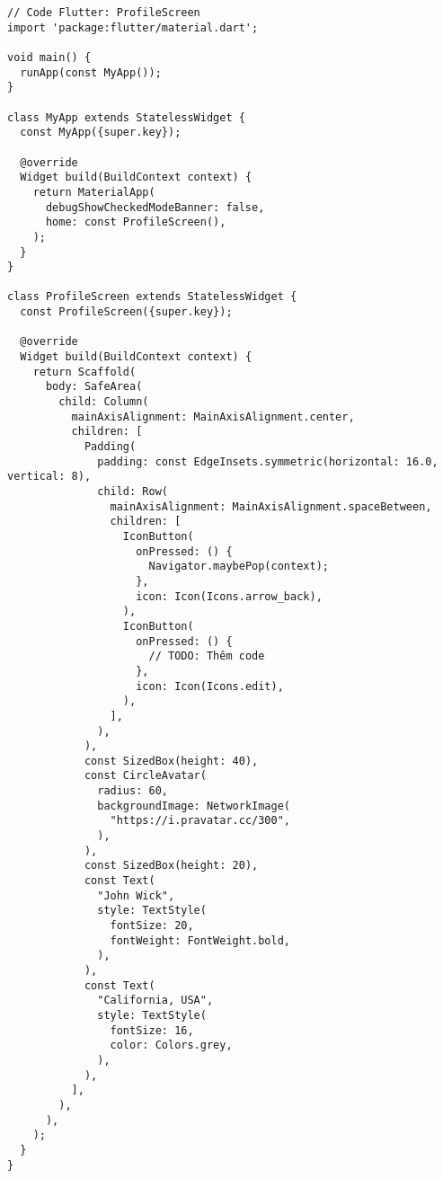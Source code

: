\documentclass[a4paper,12pt]{article} %
\begin{document}
\begin{lstlisting}
// Code Flutter: ProfileScreen
import 'package:flutter/material.dart';

void main() {
  runApp(const MyApp());
}

class MyApp extends StatelessWidget {
  const MyApp({super.key});

  @override
  Widget build(BuildContext context) {
    return MaterialApp(
      debugShowCheckedModeBanner: false,
      home: const ProfileScreen(),
    );
  }
}

class ProfileScreen extends StatelessWidget {
  const ProfileScreen({super.key});

  @override
  Widget build(BuildContext context) {
    return Scaffold(
      body: SafeArea(
        child: Column(
          mainAxisAlignment: MainAxisAlignment.center,
          children: [
            Padding(
              padding: const EdgeInsets.symmetric(horizontal: 16.0, vertical: 8),
              child: Row(
                mainAxisAlignment: MainAxisAlignment.spaceBetween,
                children: [
                  IconButton(
                    onPressed: () {
                      Navigator.maybePop(context);
                    },
                    icon: Icon(Icons.arrow_back),
                  ),
                  IconButton(
                    onPressed: () {
                      // TODO: Thêm code
                    },
                    icon: Icon(Icons.edit),
                  ),
                ],
              ),
            ),
            const SizedBox(height: 40),
            const CircleAvatar(
              radius: 60,
              backgroundImage: NetworkImage(
                "https://i.pravatar.cc/300",
              ),
            ),
            const SizedBox(height: 20),
            const Text(
              "John Wick",
              style: TextStyle(
                fontSize: 20,
                fontWeight: FontWeight.bold,
              ),
            ),
            const Text(
              "California, USA",
              style: TextStyle(
                fontSize: 16,
                color: Colors.grey,
              ),
            ),
          ],
        ),
      ),
    );
  }
}
\end{lstlisting}
\end{document}
